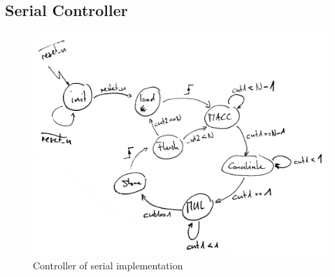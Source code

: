 \documentclass[mscthesis]{usiinfthesis}
\begin{document}
\subsection{Serial Controller}

\begin{figure}[h]
    \includegraphics[width=1\columnwidth]{arch_ctrl.png}
    \caption{Controller of serial implementation}
    \label{fig:ctrl}
\end{figure}
\end{document}
